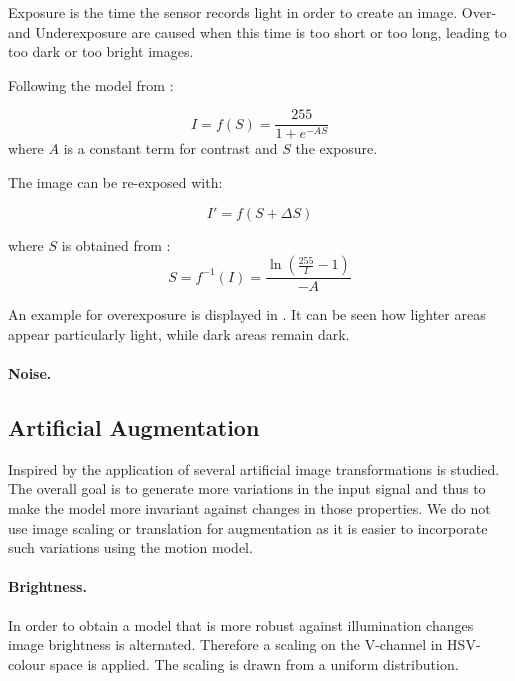 Exposure is the time the sensor records light in order to create an image. Over- and Underexposure are caused when this time is too short or too long, leading to too dark or too bright images.

Following the model from \cite{Carlson2018}:
 
\begin{equation}
 I = f(S) = \frac{255}{1 + e^{-A S}}
\end{equation}
where $A$ is a constant term for contrast and $S$ the exposure.

The image can be re-exposed with:

\begin{equation}
	I' = f(S+\Delta S)
\end{equation}

where $S$ is obtained from :
\begin{equation}
S = f^{-1}(I) = \frac{\ln(\frac{255}{I}-1)}{-A}
\end{equation}

An example for overexposure is displayed in . It can be seen how lighter areas appear particularly light, while dark areas remain dark.

\paragraph{Noise.}

\subsection{Artificial Augmentation}

Inspired by \cite{Howard2013, Redmon, Liu} the application of several artificial image transformations is studied. The overall goal is to generate more variations in the input signal and thus to make the model more invariant against changes in those properties. We do not use image scaling or translation for augmentation as it is easier to incorporate such variations using the motion model.

\paragraph{Brightness.} In order to obtain a model that is more robust against illumination changes image brightness is alternated. Therefore a scaling on the V-channel in HSV-colour space is applied. The scaling is drawn from a uniform distribution.
	
